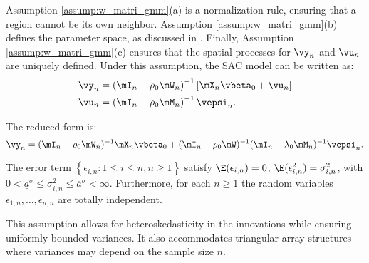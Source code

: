 Assumption \ref{assump:w_matri_gmm}(a) is a normalization rule, ensuring that a region cannot be its own neighbor. Assumption \ref{assump:w_matri_gmm}(b) defines the parameter space, as discussed in \citet[section 2.2]{kelejian2010specification}. Finally, Assumption \ref{assump:w_matri_gmm}(c) ensures that the spatial processes for $\vy_n$ and $\vu_n$ are uniquely defined. Under this assumption, the SAC model can be written as:
\begin{equation*}
	\begin{aligned}
	\vy_n  & = \left(\mI_n - \rho_0 \mW_n\right)^{-1}\left[\mX_n\vbeta_0 + \vu_n\right] \\
	\vu_n  & = \left(\mI_n -  \rho_0 \mM_n\right)^{-1}\vepsi_n.
	\end{aligned}
\end{equation*}

The reduced form is:
\begin{equation*}
\vy_n = (\mI_n - \rho_0\mW_n)^{-1}\mX_n\vbeta_0 +(\mI_n -\rho_0\mW)^{-1}(\mI_n - \lambda_0\mM_n)^{-1}\vepsi_n. 
\end{equation*}

% 


\begin{assumption}\label{assump:error_hete_gmm} 
	The error term  $\left\lbrace\epsilon_{i,n}: 1 \leq i \leq n, n\geq 1\right\rbrace$ satisfy $\E(\epsilon_{i,n}) = 0$, $\E(\epsilon_{i,n}^2) = \sigma^2_{i,n}$, with $0 < \underline{a}^\sigma \leq \sigma^2_{i,n}\leq \overline{a}^\sigma<\infty$. Furthermore, for each $n\geq 1$ the random variables $\epsilon_{1,n}, \ldots, \epsilon_{n,n}$ are totally independent.  
\end{assumption}

This assumption allows for heteroskedasticity in the innovations while ensuring uniformly bounded variances. It also accommodates triangular array structures where variances may depend on the sample size $n$. 

